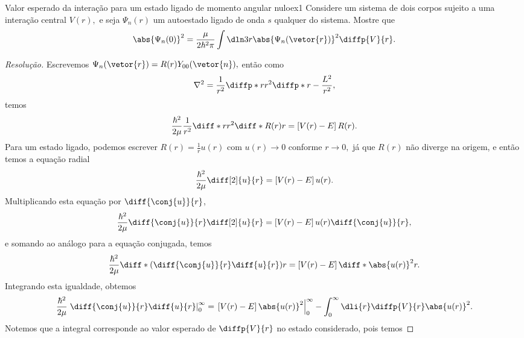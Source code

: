 \begin{exercício}{Valor esperado da interação para um estado ligado de momento angular nulo}{ex1}
    Considere um sistema de dois corpos sujeito a uma interação central \(V(r),\) e seja \(\Psi_n(r)\) um autoestado ligado de onda \(s\) qualquer do sistema. Mostre que
    \begin{equation*}
        \abs{\Psi_n(0)}^2 = \frac{\mu}{2 \hbar^2\pi} \int \dln3r \abs{\Psi_n(\vetor{r})}^2 \diffp{V}{r}.
    \end{equation*}
\end{exercício}
\begin{proof}[Resolução]
    Escrevemos \(\Psi_n(\vetor{r}) = R(r) Y_{00}(\vetor{n}),\) então como 
    \begin{equation*}
        \nabla^2 = \frac{1}{r^2} \diffp*{}{r} r^2 \diffp*{}{r} - \frac{L^2}{r^2},
    \end{equation*}
    temos
    \begin{equation*}
        \frac{\hbar^2}{2\mu} \frac{1}{r^2} \diff*{}{r} r^2 \diff*{R(r)}{r} = \left[V(r) - E\right] R(r).
    \end{equation*}
    Para um estado ligado, podemos escrever \(R(r) = \frac1r u(r)\) com \(u(r) \to 0\) conforme \(r \to 0,\) já que \(R(r)\) não diverge na origem, e então temos a equação radial
    \begin{equation*}
        \frac{\hbar^2}{2\mu} \diff[2]{u}{r} = \left[V(r) - E\right] u(r).
    \end{equation*}
    Multiplicando esta equação por \(\diff{\conj{u}}{r}\),
    \begin{equation*}
        \frac{\hbar^2}{2\mu} \diff{\conj{u}}{r} \diff[2]{u}{r} = \left[V(r) - E\right] u(r) \diff{\conj{u}}{r},
    \end{equation*}
    e somando ao análogo para a equação conjugada, temos
    \begin{equation*}
        \frac{\hbar^2}{2\mu} \diff*{\left(\diff{\conj{u}}{r} \diff{u}{r}\right)}{r} = \left[V(r) - E\right] \diff*{\abs{u(r)}^2}{r}.
    \end{equation*}
    Integrando esta igualdade, obtemos
    \begin{equation*}
        \frac{\hbar^2}{2\mu} \left. \diff{\conj{u}}{r} \diff{u}{r}\right\rvert_0^\infty = \left.\left[V(r) - E\right]\abs{u(r)}^2\right\rvert_0^\infty - \int_0^\infty \dli{r} \diffp{V}{r} \abs{u(r)}^2.
    \end{equation*}
    Notemos que a integral corresponde ao valor esperado de \(\diffp{V}{r}\) no estado considerado, pois temos

\end{proof}
